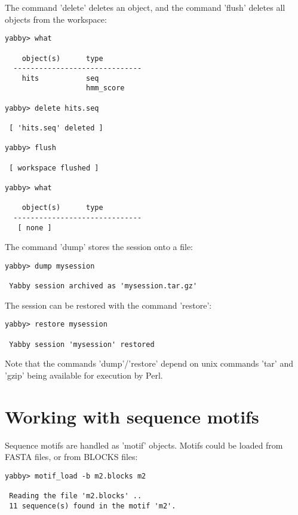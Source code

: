
The command 'delete' deletes an object, and the command 'flush'
deletes all objects from the workspace:

\begin{verbatim}
yabby> what

    object(s)      type
  ------------------------------
    hits           seq           
                   hmm_score     

yabby> delete hits.seq

 [ 'hits.seq' deleted ]

yabby> flush

 [ workspace flushed ]

yabby> what

    object(s)      type
  ------------------------------
   [ none ]
\end{verbatim}


The command 'dump' stores the session onto a file:

\begin{verbatim}
yabby> dump mysession

 Yabby session archived as 'mysession.tar.gz'
\end{verbatim}

The session can be restored with the command 'restore':

\begin{verbatim}
yabby> restore mysession

 Yabby session 'mysession' restored
\end{verbatim}

Note that the commands 'dump'/'restore' depend on unix commands
'tar' and 'gzip' being available for execution by Perl.

\section{Working with sequence motifs}


Sequence motifs are handled as 'motif' objects.  Motifs could
be loaded from FASTA files, or from BLOCKS files:


\begin{verbatim}
yabby> motif_load -b m2.blocks m2

 Reading the file 'm2.blocks' ..
 11 sequence(s) found in the motif 'm2'.
\end{verbatim}

